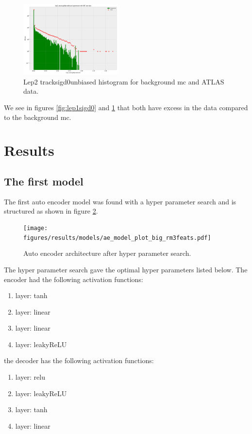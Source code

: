 \documentclass[ reprint, amsmath,amssymb, aps, nofootinbib]{revtex4-2}
\begin{document}
\begin{figure}[H]
    \centering
    \includegraphics[width=0.46\textwidth]{figures/implementation/lep2_tracksigd0pvunbiased.pdf}
    \caption{Lep2 tracksigd0unbiased histogram for background mc and ATLAS data.}
    \label{fig:lep2sigd0}
\end{figure}

We see in figures \ref{fig:lep1sigd0} and \ref{fig:lep2sigd0} that both have excess in the data compared to the background mc. 


\section{Results}

\subsection{The first model}


The first auto encoder model was found with a hyper parameter search and is structured as shown in figure \ref{fig:big_ae_plot}. 

\begin{figure}[H]
    \centering
    \texttt{[image: figures/results/models/ae\_model\_plot\_big\_rm3feats.pdf]}
    \caption{Auto encoder architecture after hyper parameter search. }
    \label{fig:big_ae_plot}
\end{figure}

The hyper parameter search gave the optimal hyper parameters listed below. The encoder had the following activation functions:
\begin{enumerate}
    \item layer: tanh
    \item layer: linear
    \item layer: linear
    \item layer: leakyReLU
\end{enumerate}

the decoder has the following activation functions: 
\begin{enumerate}
    \item layer: relu
    \item layer: leakyReLU
    \item layer: tanh
    \item layer: linear
\end{enumerate}
\end{document}
